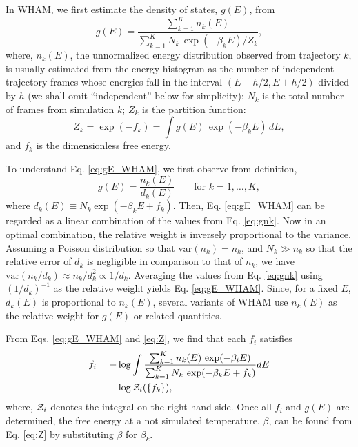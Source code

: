 \documentclass[reprint,aip,jcp,superscriptaddress]{revtex4-1}
\begin{document}
In WHAM,
we first estimate the density of states, $g(E)$, from
%
\begin{equation}
g(E)
=
\frac{
  \sum_{k = 1}^K n_k(E)
}
{
  \sum_{k = 1}^K N_k \, \exp(-\beta_k E) / Z_k
},
\label{eq:gE_WHAM}
\end{equation}
%
where,
$n_k(E)$,
the unnormalized energy distribution
observed from trajectory $k$,
is usually estimated
from the energy histogram as
the number of independent trajectory frames
whose energies fall in the interval
$(E - h/2, E + h/2)$
divided by $h$
(we shall omit ``independent'' below for simplicity);
%
$N_k$
is the total number of frames
from simulation $k$;
%
$Z_k$
is the partition function:
%
\begin{equation}
Z_k
=
\exp( - f_k )
=
\int g(E) \, \exp(-\beta_k E) \, dE,
\label{eq:Z}
\end{equation}
and
$f_k$
is the dimensionless free energy.



To understand Eq. \eqref{eq:gE_WHAM},
we first observe from definition,
%
\begin{equation}
g(E)
=
\frac{ n_k(E) }
     { d_k(E) }
\qquad
\mbox{for $k = 1, \dots, K$},
\label{eq:gnk}
\end{equation}
where $d_k(E) \equiv N_k \exp(-\beta_k E + f_k)$.
%
Then, Eq. \eqref{eq:gE_WHAM}
can be regarded as
a linear combination
of the values from
Eq. \eqref{eq:gnk}\cite{
roux1995, souaille2001, frenkel}.
%
Now in an optimal combination,
the relative weight is inversely
proportional to the variance.
%
Assuming a Poisson distribution
so that $\mathrm{var}(n_k) = n_k$,
and $N_k \gg n_k$ so that
the relative error of $d_k$ is negligible
in comparison to that of $n_k$,
we have
$\mathrm{var}(n_k/d_k) \approx n_k / d_k^2 \propto 1/d_k$.
%
Averaging the values from Eq. \eqref{eq:gnk}
using $(1/d_k)^{-1}$ as the relative weight yields
Eq. \eqref{eq:gE_WHAM}.
%
Since, for a fixed $E$,
$d_k(E)$ is proportional to $n_k(E)$,
several variants of WHAM use $n_k(E)$
as the relative weight for
$g(E)$\cite{
shen1991}
or related quantities\cite{
woolf1994, *crouzy1994, roux1995,
kastner2005, *kastner2009, kim2011}.
%




From Eqs. \eqref{eq:gE_WHAM} and \eqref{eq:Z},
we find that each $f_i$ satisfies
%
\begin{align}
f_i
&=
-\log
  \int
    \frac{
      \sum_{k = 1}^K n_k(E) \, \exp(-\beta_i E)
    }
    {
      \sum_{k = 1}^K N_k \, \exp(-\beta_k E + f_k)
    }
    dE
\label{eq:f_WHAM}
\\
&\equiv
-\log \mathcal{Z}_i(\{ f_k \}),
\notag
\end{align}
%
where,
$\mathcal{Z}_i$
denotes the integral on the right-hand side.
%
Once all $f_i$ and $g(E)$ are determined,
the free energy at a not simulated temperature, $\beta$,
can be found from Eq. \eqref{eq:Z}
by substituting $\beta$ for $\beta_k$.
\end{document}
